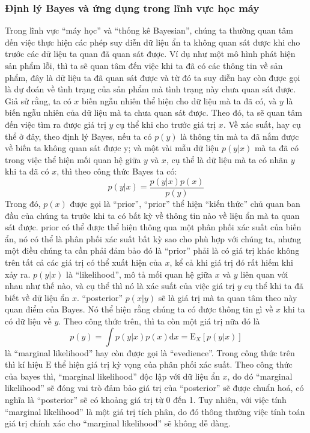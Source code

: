         \subsubsection{Định lý Bayes và ứng dụng trong lĩnh vực học máy}
        Trong lĩnh vực ``máy học'' và ``thống kê Bayesian'', chúng ta thường quan tâm đến việc thực hiện các phép suy diễn dữ liệu ẩn ta không quan sát được khi cho trước các dữ liệu ta quan đã quan sát được.
        Ví dụ như một mô hình phát hiện sản phẩm lỗi, thì ta sẽ quan tâm đến việc khi ta đã có các thông tin về sản phẩm, đây là dữ liệu ta đã quan sát được và từ đó ta suy diễn hay còn được gọi là dự đoán về tình trạng của sản phẩm mà tình trạng này chưa quan sát được. 
        Giả sử rằng, ta có $x$ biến ngẫu nhiên thể hiện cho dữ liệu mà ta đã có, và $y$ là biến ngẫu nhiên của dữ liệu mà ta chưa quan sát được.
        Theo đó, ta sẽ quan tâm đến việc tìm ra được giá trị $y$ cụ thể khi cho trước giá trị $x$. 
        Về xác suất, hay cụ thể ở đây, theo định lý Bayes, nếu ta có $p(y)$ là thông tin mà ta đã nắm được về biến ta không quan sát được y; và một vài mẫu dữ liệu $p(y|x)$ mà ta đã có trong việc thể hiện mối quan hệ giữa $y$ và $x$, cụ thể là dữ liệu mà ta có nhãn $y$ khi ta đã có $x$, thì theo công thức Bayes ta có: $$p(y|x) = \frac{p(y|x)p(x)}{p(y)}$$
        Trong đó, $p(x)$ được gọi là ``prior'', ``prior'' thể hiện ``kiến thức'' chủ quan ban đầu của chúng ta trước khi ta có bất kỳ về thông tin nào về liệu ẩn mà ta quan sát được.
        prior có thể được thể hiện thông qua một phân phối xác suất của biến ẩn, nó có thể là phân phối xác suất bất kỳ sao cho phù hợp với chúng ta, nhưng một điều chúng ta cần phải đảm bảo đó là ``prior'' phải là có giá trị khác không trên tất cả các giá trị có thể xuất hiện của $x$, kể cả khi giá trị đó rất hiếm khi xảy ra.
        $p(y|x)$ là ``likelihood'', mô tả mối quan hệ giữa $x$ và $y$ liên quan với nhau như thế nào, và cụ thể thì nó là xác suất của việc giá trị $y$ cụ thể khi ta đã biết về dữ liệu ẩn $x$.
        ``posterior'' $p(x|y)$ sẽ là giá trị mà ta quan tâm theo này quan điểm của Bayes. Nó thể hiện rằng chúng ta có được thông tin gì về $x$ khi ta có dữ liệu về $y$.
        Theo công thức trên, thì ta còn một giá trị nữa đó là $$p(y) = \int {p(y|x)p(x)\text{d}x = \mathrm{E}_X[p(y|x)]}$$ là ``marginal likelihood'' hay còn được gọi là ``evedience''. Trong công thức trên thì kí hiệu $\mathrm{E}$ thể hiện giá trị kỳ vọng của phân phối xác suất. Theo công thức của bayes thì, ``marginal likelihood'' độc lập với dữ liệu ẩn $x$, do đó ``marginal likelihood'' sẽ đóng vai trò đảm bảo giá trị của ``posterior'' sẽ được chuẩn hoá, có nghĩa là ``posterior'' sẽ có khoảng giá trị từ 0 đến 1. Tuy nhiên, với việc tính ``marginal likelihood'' là một giá trị tích phân, do đó thông thường việc tính toán giá trị chính xác cho ``marginal likelihood'' sẽ không dễ dàng. 


